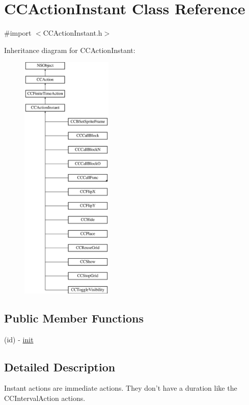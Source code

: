 \hypertarget{interface_c_c_action_instant}{\section{C\-C\-Action\-Instant Class Reference}
\label{interface_c_c_action_instant}
}


{\ttfamily \#import $<$C\-C\-Action\-Instant.\-h$>$}

Inheritance diagram for C\-C\-Action\-Instant\-:\begin{figure}[H]
\begin{center}
\leavevmode
\includegraphics[height=12.000000cm]{interface_c_c_action_instant}
\end{center}
\end{figure}
\subsection*{Public Member Functions}
\begin{DoxyCompactItemize}
\item 
(id) -\/ \hyperlink{interface_c_c_action_instant_a5f4c036018335705f1f4f5c2691c165b}{init}
\end{DoxyCompactItemize}


\subsection{Detailed Description}
Instant actions are immediate actions. They don't have a duration like the C\-C\-Interval\-Action actions. 

